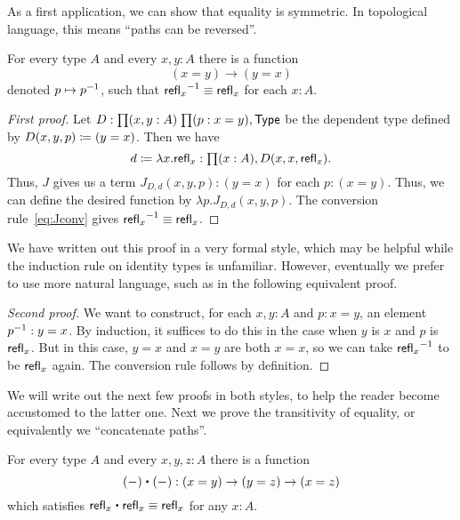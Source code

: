 As a first application, we can show that equality is symmetric.
In topological language, this means ``paths can be reversed''.

\begin{lem}\label{lem:opp}
  For every type $A$ and every $x,y:A$ there is a function
  \begin{equation*}
    (x= y)\to(y= x)
  \end{equation*}
  denoted $p\mapsto \mathord{{p}^{-1}}$, such that $\mathord{{\mathsf{refl}_{x}}^{-1}}\equiv\mathsf{refl}_{x}$ for each $x:A$.
\end{lem}
\begin{proof}[First proof]
  Let $D:\prd{x,y:A}{p:x= y} \type$ be the dependent type defined by $D(x,y,p)\coloneqq (y= x)$.
  Then we have
  \begin{equation*}
    d\defeq \lambda x.\refl{x}:\prd{x:A} D(x,x,\refl{x}).
  \end{equation*}
  Thus, $J$ gives us a term $J_{D,d}(x,y,p): (y= x)$ for each $p:(x= y)$.
  Thus, we can define the desired function by $\lambda p. J_{D,d}(x,y,p)$.
  The conversion rule~\eqref{eq:Jconv} gives $\mathord{{\mathsf{refl}_{x}}^{-1}}\equiv \mathsf{refl}_{x}$.
\end{proof}

We have written out this proof in a very formal style, which may be helpful while the induction rule on identity types is unfamiliar.
However, eventually we prefer to use more natural language, such as in the following equivalent proof.

\begin{proof}[Second proof]
  We want to construct, for each $x,y:A$ and $p:x=y$, an element $\mathord{{p}^{-1}}:y=x$.
  By induction, it suffices to do this in the case when $y$ is $x$ and $p$ is $\mathsf{refl}_{x}$.
  But in this case, $y=x$ and $x=y$ are both $x=x$, so we can take $\mathord{{\mathsf{refl}_{x}}^{-1}}$ to be $\mathsf{refl}_{x}$ again.
  The conversion rule follows by definition.
\end{proof}

We will write out the next few proofs in both styles, to help the reader become accustomed to the latter one.
Next we prove the transitivity of equality, or equivalently we ``concatenate paths''.

\begin{lem}\label{lem:concat}
  For every type $A$ and every $x,y,z:A$ there is a function
  \begin{equation*}
    {(-)}\ct{(-)}:(x= y) \to (y= z)\to (x=  z)
  \end{equation*}
  which satisfies $\refl{x}\ct \refl{x}\jdeq \refl{x}$ for any $x:A$.
\end{lem}

